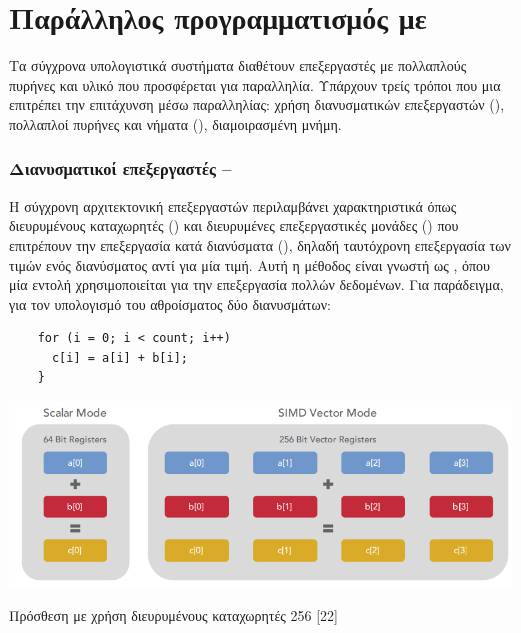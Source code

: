\section{Παράλληλος προγραμματισμός με }
Τα σύγχρονα υπολογιστικά συστήματα διαθέτουν επεξεργαστές  με πολλαπλούς πυρήνες και υλικό που προσφέρεται για παραλληλία. Υπάρχουν τρείς τρόποι που μια  επιτρέπει την επιτάχυνση μέσω παραλληλίας: χρήση διανυσματικών επεξεργαστών (), πολλαπλοί πυρήνες και νήματα (), διαμοιρασμένη μνήμη.

\subsubsection{Διανυσματικοί επεξεργαστές – }

Η σύγχρονη αρχιτεκτονική επεξεργαστών περιλαμβάνει χαρακτηριστικά όπως διευρυμένους καταχωρητές () και διευρυμένες επεξεργαστικές μονάδες () που επιτρέπουν την επεξεργασία κατά διανύσματα (), δηλαδή ταυτόχρονη επεξεργασία των τιμών ενός διανύσματος αντί για μία τιμή. Αυτή η μέθοδος είναι γνωστή ως , όπου μία εντολή χρησιμοποιείται για την επεξεργασία πολλών δεδομένων. Για παράδειγμα, για τον υπολογισμό του αθροίσματος δύο διανυσμάτων:


\begin{verbatim}
    for (i = 0; i < count; i++) 
      c[i] = a[i] + b[i]; 
    }
\end{verbatim}

\begin{Illustration}[!h] 
	\centering
	\includegraphics[width=\textwidth]{images/image043.png} 
	\caption{Πρόσθεση με χρήση διευρυμένους καταχωρητές 256 [22]}
	\label{image-registers-add}
\end{Illustration}

